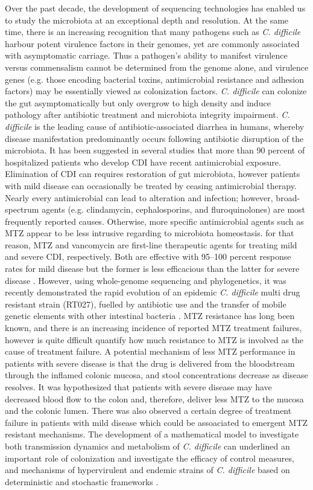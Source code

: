 \documentclass{article}
\begin{document}
Over the past decade, the development of sequencing technologies has enabled us to study the microbiota at an exceptional depth and resolution. At the same time, there is an increasing recognition that many pathogens such as {\it C. difficile} harbour potent virulence factors in their genomes, yet are commonly associated with asymptomatic carriage. Thus a pathogen's ability to manifest virulence versus commensalism cannot be determined from the genome alone, and virulence genes (e.g. those encoding bacterial toxins, antimicrobial resistance and adhesion factors) may be essentially viewed as colonization factors. {\it C. difficile} can colonize the gut asymptomatically but only overgrow to high density and induce pathology after antibiotic treatment and microbiota integrity impairment. {\it C. difficile} is the leading cause of antibiotic-associated diarrhea in humans, whereby disease manifestation predominantly occurs following antibiotic disruption of the microbiota. It has been suggested in several studies that more than 90 percent of hospitalized patients who develop CDI have recent antimicrobial exposure. Elimination of CDI can requires restoration of gut microbiota, however patients with mild disease can occasionally be treated by ceasing antimicrobial therapy. Nearly every antimicrobial can lead to alteration and infection; however, broad-spectrum agents (e.g. clindamycin, cephalosporins, and fluroquinolones) are most frequently reported causes. Otherwise, more specific antimicrobial agents such as MTZ appear to be less intrusive regarding to microbiota homeostasis. for that reason, MTZ and vancomycin are first-line therapeutic agents for treating mild and severe CDI, respectively. Both are effective with 95–100 percent response rates for mild disease but the former is less efficacious than the latter for severe disease \cite{Zar}. However, using whole-genome sequencing and phylogenetics, it was recently demonstrated the rapid evolution of an epidemic {\it C. difficile} multi drug resistant strain (RT027), fuelled by antibiotic use and the transfer of mobile genetic elements with other intestinal bacteria \cite{Pham}. MTZ resistance has long been known, and there is an increasing incidence of reported MTZ treatment failures, however is quite dfficult quantify how much resistance to MTZ is involved as the cause of treatment failure. A potential mechanism of less MTZ performance in patients with severe disease is that the drug is delivered from the bloodstream through the inflamed colonic mucosa, and stool concentrations decrease as disease resolves. It was hypothesized that patients with severe disease may have decreased blood flow to the colon and, therefore, deliver less MTZ to the mucosa and the colonic lumen. There was also observed a certain degree of treatment failure in patients with mild disease which could be assoaciated to emergent MTZ resistant mechanisms. The development of a mathematical model to investigate both transmission dynamics and metabolism of {\it C. difficile} can underlined an important role of colonization and investigate the efficacy of control measures, and mechanisms of hypervirulent and endemic strains of {\it C. difficile} based on deterministic and stochastic frameworks \cite{Chamchod}.
\end{document}
